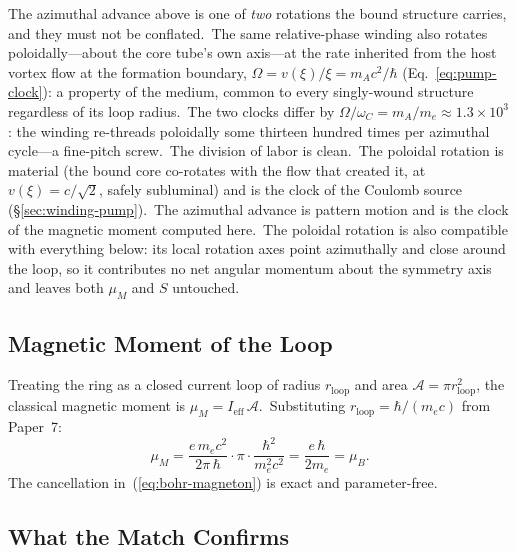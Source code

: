 \documentclass[12pt,letterpaper]{article}
\newcommand{\rloop}{r_{\mathrm{loop}}}
\begin{document}
The azimuthal advance above is one of \emph{two} rotations the bound
structure carries, and they must not be conflated.\ The same
relative-phase winding also rotates poloidally---about the core tube's
own axis---at the rate inherited from the host vortex flow at the
formation boundary, $\Omega = v(\xi)/\xi = m_A c^2/\hbar$
(Eq.~\ref{eq:pump-clock}): a property of the medium, common to every
singly-wound structure regardless of its loop radius.\ The two clocks
differ by $\Omega/\omega_C = m_A/m_e \approx 1.3\times10^{3}$: the
winding re-threads poloidally some thirteen hundred times per azimuthal
cycle---a fine-pitch screw.\ The division of labor is clean.\ The
poloidal rotation is material (the bound core co-rotates with the flow
that created it, at $v(\xi) = c/\sqrt{2}$, safely subluminal) and is the
clock of the Coulomb source (§\ref{sec:winding-pump}).\ The azimuthal
advance is pattern motion and is the clock of the magnetic moment
computed here.\ The poloidal rotation is also compatible with everything
below: its local rotation axes point azimuthally and close around the
loop, so it contributes no net angular momentum about the symmetry axis
and leaves both $\mu_M$ and $S$ untouched.

\subsection{Magnetic Moment of the Loop}

Treating the ring as a closed current loop of radius $\rloop$ and area
$\mathcal{A} = \pi \rloop^2$, the classical magnetic moment is
$\mu_M = I_{\text{eff}}\,\mathcal{A}$.\ Substituting
$\rloop = \hbar/(m_e c)$ from Paper~7:
\begin{equation}
\mu_M = \frac{e\,m_e c^2}{2\pi\,\hbar}\cdot \pi\cdot\frac{\hbar^2}{m_e^2 c^2}
      = \frac{e\,\hbar}{2 m_e}
      = \mu_B.
\label{eq:bohr-magneton}
\end{equation}
The cancellation in~(\ref{eq:bohr-magneton}) is exact and
parameter-free.

\subsection{What the Match Confirms}
\end{document}
